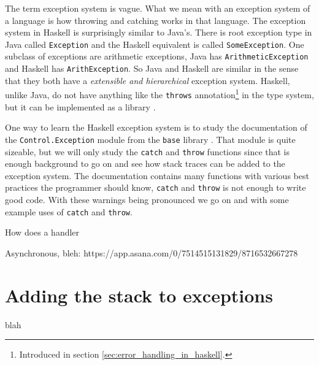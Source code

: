The term exception system is vague. What we mean with an exception
system of a language is how throwing and catching works in that
language. The exception system in Haskell is surprisingly similar to
Java's.  There is root exception type in Java called \texttt{Exception}
and the Haskell equivalent is called \texttt{SomeException}. One
subclass of exceptions are arithmetic exceptions, Java has
\texttt{ArithmeticException} and Haskell has \texttt{ArithException}.
So Java and Haskell are similar in the sense that they both have a
\emph{extensible and hierarchical} exception system.  Haskell, unlike
Java, do not have anything like the \texttt{throws}
annotation\footnote{Introduced in section
\ref{sec:error_handling_in_haskell}.}
in the type system, but it can be implemented as a library
\cite{github_pepeiborra_cme}.

One way to learn the Haskell exception system is to study the
documentation of the \texttt{Control.Exception} module from the
\texttt{base} library \cite{hackage_base_control_exception,
hackage_control_monad_exception}.
That module is quite sizeable, but
we will only study the \texttt{catch} and \texttt{throw} functions since
that is enough background to go on and see how stack traces can be added
to the exception system. The documentation contains many functions with various best practices
the programmer should know, \texttt{catch} and
\texttt{throw} is not enough to write good code. With
these warnings being pronounced we go on and with some example
uses of \texttt{catch} and \texttt{throw}.




How does a handler

Asynchronous, bleh: https://app.asana.com/0/7514515131829/8716532667278


\section{Adding the stack to exceptions}

blah
